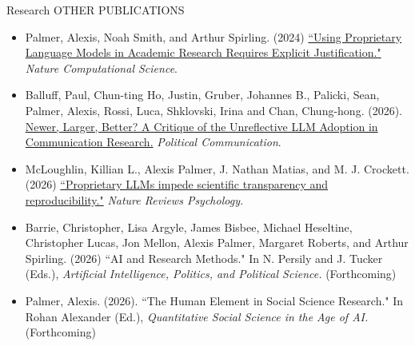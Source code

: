 \documentclass{resume} %
\begin{document}
\begin{rSection}{Research}
		OTHER PUBLICATIONS
		\begin{itemize}
			\item Palmer, Alexis, Noah Smith, and Arthur Spirling. (2024) \href{https://doi.org/10.1038/s43588-023-00585-1}{``Using Proprietary Language Models in Academic Research Requires Explicit Justification."} \textit{Nature Computational Science}. 
			\item Balluff, Paul, Chun-ting Ho, Justin, Gruber, Johannes B., Palicki, Sean, Palmer, Alexis, Rossi, Luca, Shklovski, Irina and Chan, Chung-hong. (2026). \href{https://doi.org/10.1080/10584609.2026.2618486}{Newer, Larger, Better? A Critique of the Unreflective LLM Adoption in Communication Research.} \textit{Political Communication}. 
			\item McLoughlin, Killian L., Alexis Palmer, J. Nathan Matias, and M. J. Crockett. (2026) \href{https://doi.org/10.1038/s44159-026-00593-8}{``Proprietary LLMs impede scientific transparency and reproducibility."} \textit{Nature Reviews Psychology.}
			\item Barrie, Christopher, Lisa Argyle, James Bisbee, Michael Heseltine, Christopher Lucas, Jon Mellon, Alexis Palmer, Margaret Roberts, and Arthur Spirling. (2026) ``AI and Research Methods." In N. Persily and J. Tucker (Eds.), \textit{Artificial Intelligence, Politics, and Political Science.} (Forthcoming)
			\item Palmer, Alexis. (2026). ``The Human Element in Social Science Research." In Rohan Alexander (Ed.), \textit{Quantitative Social Science in the Age of AI.} (Forthcoming)
			
			
			
		\end{itemize}
		
	\end{rSection}
	
\end{document}
